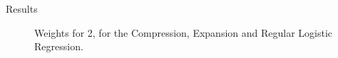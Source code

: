 \documentclass{beamer}
\begin{document}
	\begin{frame}{Results}
		\begin{figure}[h!]
			\centering
			\caption{\enspace Weights for 2, for the Compression, Expansion and Regular Logistic Regression.}
		\end{figure}
	\end{frame}
	
\end{document}

